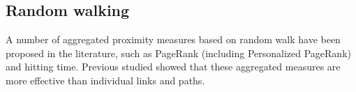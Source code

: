 \subsection{Random walking}
A number of aggregated proximity measures based on random walk have been proposed in the 
literature, such as PageRank (including Personalized PageRank) and hitting time. Previous
studied showed that these aggregated measures are more effective than individual links 
and paths.